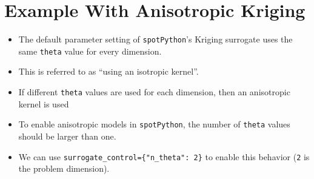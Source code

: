 \documentclass[
  letterpaper,
  DIV=11,
  numbers=noendperiod]{scrreprt}
\providecommand{\tightlist}{%
  \setlength{\itemsep}{0pt}\setlength{\parskip}{0pt}}\usepackage{longtable,booktabs,array}
\begin{document}
\hypertarget{example-with-anisotropic-kriging}{%
\section{Example With Anisotropic
Kriging}\label{example-with-anisotropic-kriging}}

\begin{itemize}
\tightlist
\item
  The default parameter setting of \texttt{spotPython}'s Kriging
  surrogate uses the same \texttt{theta} value for every dimension.
\item
  This is referred to as ``using an isotropic kernel''.
\item
  If different \texttt{theta} values are used for each dimension, then
  an anisotropic kernel is used
\item
  To enable anisotropic models in \texttt{spotPython}, the number of
  \texttt{theta} values should be larger than one.
\item
  We can use \texttt{surrogate\_control=\{"n\_theta":\ 2\}} to enable
  this behavior (\texttt{2} is the problem dimension).
\end{itemize}
\end{document}
